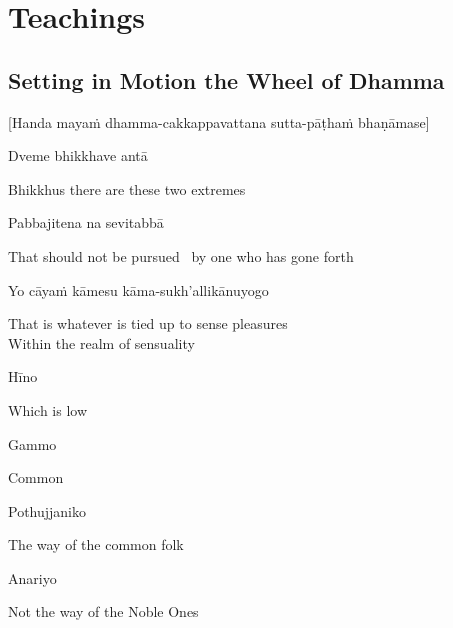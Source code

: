 
\chapter{Teachings}

\section{Setting in Motion the Wheel of Dhamma}
\label{wheel-of-dhamma-abridged}

\begin{center}
  [Handa mayaṁ dhamma-cakkappavattana sutta-pāṭhaṁ bhaṇāmase]
\end{center}

Dveme bhikkhave antā

\begin{cprenglish}
  Bhikkhus there are these two extremes
\end{cprenglish}

Pabbajitena na sevitabbā

\begin{cprenglish}
  That should not be pursued \breathmark\ by one who has gone forth
\end{cprenglish}

Yo cāyaṁ kāmesu kāma-sukh’allikānuyogo

\begin{cprenglish}
  That is whatever is tied up to sense pleasures\\
  Within the realm of sensuality
\end{cprenglish}

Hīno

\begin{cprenglish}
  Which is low
\end{cprenglish}

Gammo

\begin{cprenglish}
  Common
\end{cprenglish}

Pothujjaniko

\begin{cprenglish}
  The way of the common folk
\end{cprenglish}

Anariyo

\begin{cprenglish}
  Not the way of the Noble Ones
\end{cprenglish}

